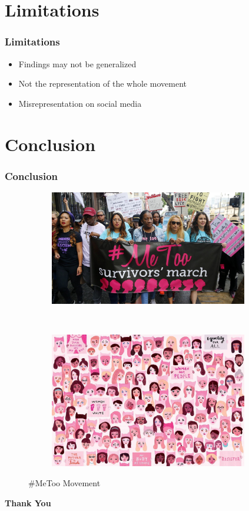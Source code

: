\documentclass{beamer}
\begin{document}
\section{Limitations}
\begin{frame}
\frametitle{Limitations}
\begin{itemize}
\item Findings may not be generalized \pause
\item Not the representation of the whole movement \pause
\item Misrepresentation on social media
\end{itemize}
\end{frame}
\section{Conclusion}
\begin{frame}
\frametitle{Conclusion}
\begin{figure}
\centering
\begin{subfigure}{0.45\textwidth}
\includegraphics[width=0.95\textwidth]{pic1.jpg}
\end{subfigure}
~
\begin{subfigure}{0.45\textwidth}
\includegraphics[width=0.95\textwidth]{pic2.jpg}
\end{subfigure}
\caption{\#MeToo Movement}

\end{figure}

\end{frame}
\begin{frame}
\centering
\textbf{\Huge Thank You}
\end{frame}
\end{document}
